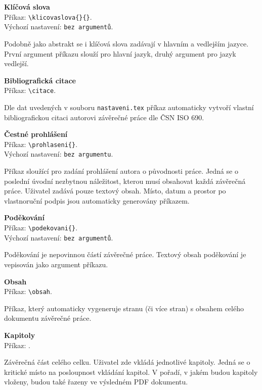 \textbf{Klíčová slova}\\
Příkaz: \verb|\klicovaslova{}{}|.\\
Výchozí nastavení: \verb|bez argumentů|.

Podobně jako abstrakt se i klíčová slova zadávají v hlavním a vedlejším jazyce. První argument příkazu slouží pro hlavní jazyk, druhý argument pro jazyk vedlejší.

\vspace{8pt}

\textbf{Bibliografická citace}\\
Příkaz: \verb|\citace|.

Dle dat uvedených v souboru \verb|nastaveni.tex| příkaz automaticky vytvoří vlastní bibliografickou citaci autorovi závěrečné práce dle ČSN ISO 690.

\vspace{8pt}

\textbf{Čestné prohlášení}\\
Příkaz: \verb|\prohlaseni{}|.\\
Výchozí nastavení: \verb|bez argumentu|.

Příkaz sloužící pro zadání prohlášení autora o původnosti práce. Jedná se o poslední úvodní nezbytnou náležitost, kterou musí obsahovat každá závěrečná práce. Uživatel zadává pouze textový obsah. Místo, datum a prostor po vlastnoruční podpis jsou automaticky generovány příkazem.

\vspace{8pt}

\textbf{Poděkování}\\
Příkaz: \verb|\podekovani{}|.\\
Výchozí nastavení: \verb|bez argumentů|.

Poděkování je nepovinnou částí závěrečné práce. Textový obsah poděkování je vepisován jako argument příkazu.


\vspace{8pt}

\textbf{Obsah}\\
Příkaz: \verb|\obsah|.

Příkaz, který automaticky vygeneruje stranu (či více stran) s obsahem celého dokumentu závěrečné práce.


\vspace{8pt}

\textbf{Kapitoly}\\
Příkaz: \verb||.

Závěrečná část celého celku. Uživatel zde vkládá jednotlivé kapitoly. Jedná se o kritické místo na posloupnost vkládání kapitol. V pořadí, v jakém budou kapitoly vloženy, budou také řazeny ve výsledném PDF dokumentu.

